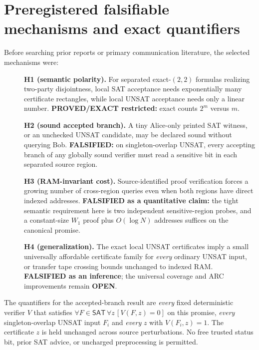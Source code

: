 \documentclass[11pt]{article}
\newcommand{\SAT}{\mathsf{SAT}}
\begin{document}
\section{Preregistered falsifiable mechanisms and exact quantifiers}
Before searching prior reports or primary communication literature, the selected mechanisms were:
\begin{description}
\item[] \textbf{H1 (semantic polarity).} For separated exact-$(2,2)$ formulas realizing two-party disjointness, local SAT acceptance needs exponentially many certificate rectangles, while local UNSAT acceptance needs only a linear number. \textbf{PROVED/EXACT restricted:} exact counts $2^m$ versus $m$.
\item[] \textbf{H2 (sound accepted branch).} A tiny Alice-only printed SAT witness, or an unchecked UNSAT candidate, may be declared sound without querying Bob. \textbf{FALSIFIED:} on singleton-overlap UNSAT, every accepting branch of any globally sound verifier must read a sensitive bit in each separated source region.
\item[] \textbf{H3 (RAM-invariant cost).} Source-identified proof verification forces a growing number of cross-region queries even when both regions have direct indexed addresses. \textbf{FALSIFIED as a quantitative claim:} the tight semantic requirement here is two independent sensitive-region probes, and a constant-size $W_1$ proof plus $O(\log N)$ addresses suffices on the canonical promise.
\item[] \textbf{H4 (generalization).} The exact local UNSAT certificates imply a small universally affordable certificate family for \emph{every} ordinary UNSAT input, or transfer tape crossing bounds unchanged to indexed RAM. \textbf{FALSIFIED as an inference}; the universal coverage and ARC improvements remain \textbf{OPEN}.
\end{description}
The quantifiers for the accepted-branch result are \emph{every} fixed deterministic verifier $V$ that satisfies
$\forall F\in\SAT\,\forall z\,[V(F,z)=0]$ on this promise, \emph{every} singleton-overlap UNSAT input $F_i$ and \emph{every} $z$ with $V(F_i,z)=1$. The certificate $z$ is held unchanged across source perturbations. No free trusted status bit, prior SAT advice, or uncharged preprocessing is permitted.
\end{document}
